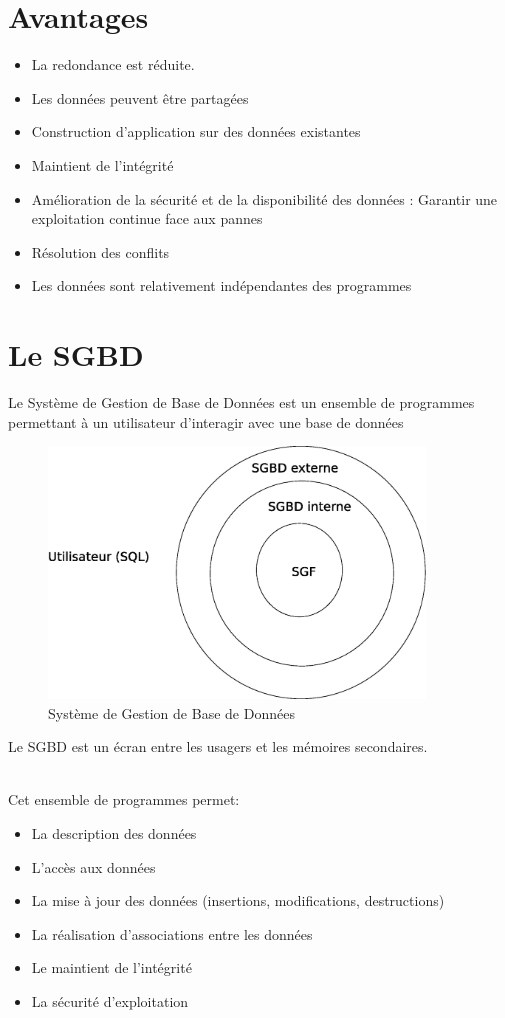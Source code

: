 \documentclass[12pt,a4paper,openany]{book}
\newcommand{\bd}{base de données}
\begin{document}
	\section{Avantages}
	\begin{itemize}
		\item La redondance est réduite.
		\item Les données peuvent être partagées
		\item Construction d'application sur des données existantes
		\item Maintient de l'intégrité
		\item Amélioration de la sécurité et de la disponibilité des données : Garantir une exploitation continue face aux pannes
		\item Résolution des conflits
		\item Les données sont relativement indépendantes des programmes
	\end{itemize}

	\section{Le SGBD}
	\begin{definition}
		Le Système de Gestion de Base de Données est un ensemble de programmes permettant à un utilisateur d'interagir avec une \bd
	\end{definition}
	\begin{figure}[H]
		\centering
		\includegraphics[width=10cm]{sgbd.eps}
		\caption{Système de Gestion de Base de Données}
	\end{figure}
	\begin{remarque}
		Le SGBD est un écran entre les usagers et les mémoires secondaires.\\ ~
	\end{remarque}
	
	Cet ensemble de programmes permet:
	\begin{itemize}
		\item La description des données
		\item L'accès aux données
		\item La mise à jour des données (insertions, modifications, destructions)
		\item La réalisation d'associations entre les données
		\item Le maintient de l'intégrité
		\item La sécurité d'exploitation
	\end{itemize}
\end{document}
